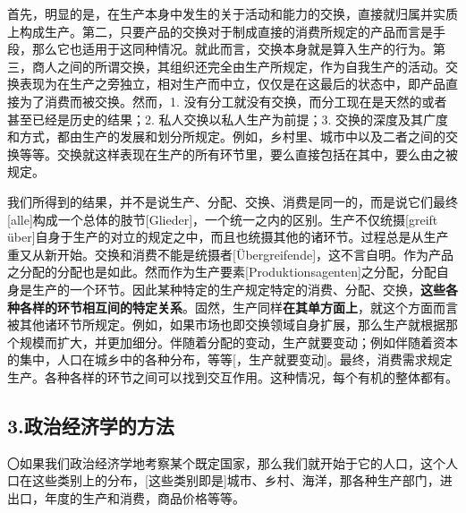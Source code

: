 \documentclass[a4paper,twoside,12pt]{ctexart}
\begin{document}
首先，明显的是，在生产本身中发生的关于活动和能力的交换，直接就归属并实质上构成生产。第二，只要产品的交换对于制成直接的消费所规定的产品而言是手段，那么它也适用于这同种情况。就此而言，交换本身就是算入生产的行为。第三，商人之间的所谓交换，其组织还完全由生产所规定，作为自我生产的活动。交换表现为在生产之旁独立，相对生产而中立，仅仅是在这最后的状态中，即产品直接为了消费而被交换。然而，1. 没有分工就没有交换，而分工现在是天然的或者甚至已经是历史的结果；2. 私人交换以私人生产为前提；3. 交换的深度及其广度和方式，都由生产的发展和划分所规定。例如，乡村里、城市中以及二者之间的交换等等。交换就这样表现在生产的所有环节里，要么直接包括在其中，要么由之被规定。

我们所得到的结果，并不是说生产、分配、交换、消费是同一的，而是说它们最终[alle]构成一个总体的肢节[Glieder]，一个统一之内的区别。生产不仅统摄[greift über]自身于生产的对立的规定之中，而且也统摄其他的诸环节。过程总是从生产重又从新开始。交换和消费不能是统摄者[Übergreifende]，这不言自明。作为产品之分配的分配也是如此。然而作为生产要素[Produktionsagenten]之分配，分配自身是生产的一个环节。因此某种特定的生产规定特定的消费、分配、交换，\textbf{这些各种各样的环节相互间的特定关系}。固然，生产同样\textbf{在其单方面上}，就这个方面而言被其他诸环节所规定。例如，如果市场也即交换领域自身扩展，那么生产就根据那个规模而扩大，并更加细分。伴随着分配的变动，生产就要变动；例如伴随着资本的集中，人口在城乡中的各种分布，等等[，生产就要变动]。最终，消费需求规定生产。各种各样的环节之间可以找到交互作用。这种情况，每个有机的整体都有。

\newpage

\subsection{3.政治经济学的方法}

〇如果我们政治经济学地考察某个既定国家，那么我们就开始于它的人口，这个人口在这些类别上的分布，[这些类别即是]城市、乡村、海洋，那各种生产部门，进出口，年度的生产和消费，商品价格等等。
\end{document}
